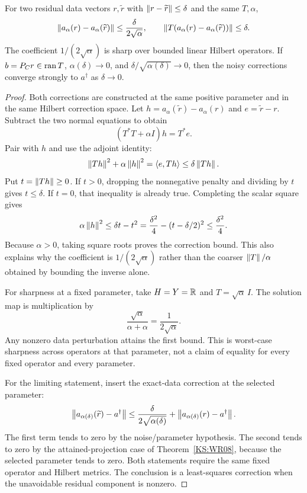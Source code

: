 \begin{KStheorem}\label{KS:WR09}
For two residual data vectors $r,\widetilde r$ with $\left\lVert r-\widetilde r\right\rVert\le\delta$ and the same $T,\alpha$,
\[
 \left\lVert a_\alpha(r)-a_\alpha(\widetilde r)\right\rVert
 \le\frac{\delta}{2\sqrt\alpha},\qquad
 \left\lVert T(a_\alpha(r)-a_\alpha(\widetilde r))\right\rVert\le\delta.
\]
The coefficient $1/(2\sqrt\alpha)$ is sharp over bounded linear Hilbert operators. If $b=P_Cr\in\operatorname{ran} T$, $\alpha(\delta)\to0$, and $\delta/\sqrt{\alpha(\delta)}\to0$, then the noisy corrections converge strongly to $a^\dagger$ as $\delta\to0$.
\end{KStheorem}
\begin{proof}
Both corrections are constructed at the same positive parameter and in the same Hilbert correction space. Let $h=a_\alpha(\widetilde r)-a_\alpha(r)$ and $e=\widetilde r-r$. Subtract the two normal equations to obtain
\[
 (T^*T+\alpha I)h=T^*e.
\]
Pair with $h$ and use the adjoint identity:
\[
 \left\lVert Th\right\rVert^2+\alpha\left\lVert h\right\rVert^2
 =\langle e,Th\rangle\le\delta\left\lVert Th\right\rVert.
\]
Put $t=\left\lVert Th\right\rVert\ge0$. If $t>0$, dropping the nonnegative penalty and dividing by $t$ gives $t\le\delta$. If $t=0$, that inequality is already true. Completing the scalar square gives
\[
 \alpha\left\lVert h\right\rVert^2\le\delta t-t^2
 =\frac{\delta^2}{4}-(t-\delta/2)^2
 \le\frac{\delta^2}{4}.
\]
Because $\alpha>0$, taking square roots proves the correction bound. This also explains why the coefficient is $1/(2\sqrt\alpha)$ rather than the coarser $\left\lVert T\right\rVert/\alpha$ obtained by bounding the inverse alone.

For sharpness at a fixed parameter, take $H=Y=\mathbb R$ and $T=\sqrt\alpha\,I$. The solution map is multiplication by
\[
 \frac{\sqrt\alpha}{\alpha+\alpha}=\frac1{2\sqrt\alpha}.
\]
Any nonzero data perturbation attains the first bound. This is worst-case sharpness across operators at that parameter, not a claim of equality for every fixed operator and every parameter.

For the limiting statement, insert the exact-data correction at the selected parameter:
\[
 \left\lVert a_{\alpha(\delta)}(\widetilde r)-a^\dagger\right\rVert
 \le\frac{\delta}{2\sqrt{\alpha(\delta)}}
       +\left\lVert a_{\alpha(\delta)}(r)-a^\dagger\right\rVert.
\]
The first term tends to zero by the noise/parameter hypothesis. The second tends to zero by the attained-projection case of Theorem~\ref{KS:WR08}, because the selected parameter tends to zero. Both statements require the same fixed operator and Hilbert metrics. The conclusion is a least-squares correction when the unavoidable residual component is nonzero.
\end{proof}

